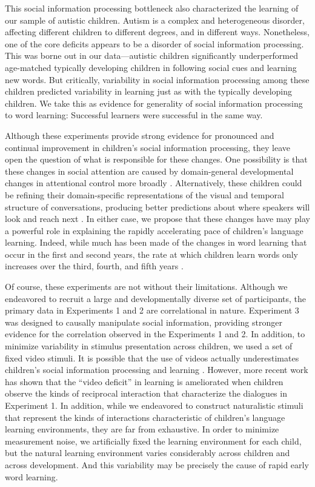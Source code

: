 \documentclass{pnastwo}
\begin{document}
\begin{article}
This social information processing bottleneck also characterized the learning of our sample of autistic children. Autism is a complex and heterogeneous disorder, affecting different children to different degrees, and in different ways. Nonetheless, one of the core deficits appears to be a disorder of social information processing. This was borne out in our data---autistic children significantly underperformed age-matched typically developing children in following social cues and learning new words. But critically, variability in social information processing among these children predicted variability in learning just as with the typically developing children.  We take this as evidence for generality of social information processing to word learning: Successful learners were successful in the same way.

Although these experiments provide strong evidence for pronounced and continual improvement in children's social information processing, they leave open the question of what is responsible for these changes. One possibility is that these changes in social attention are caused by domain-general developmental changes in attentional control more broadly \cite{rueda2005,smith2013}. Alternatively, these children could be refining their domain-specific representations of the visual and temporal structure of conversations, producing better predictions about where speakers will look and reach next \cite{acheson2009,krogh-jespersen2015}. In either case, we propose that these changes have may play a powerful role in explaining the rapidly accelerating pace of children's language learning. Indeed, while much has been made of the changes in word learning that occur in the first and second years, the rate at which children learn words only increases over the third, fourth, and fifth years \cite{bloom2000}. 

Of course, these experiments are not without their limitations. Although we endeavored to recruit a large and developmentally diverse set of participants, the primary data in Experiments 1 and 2 are correlational in nature. Experiment 3 was designed to causally manipulate social information, providing stronger evidence for the correlation observed in the Experiments 1 and 2. In addition, to minimize variability in stimulus presentation across children, we used a set of fixed video stimuli. It is possible that the use of videos actually underestimates children's social information processing and learning \cite{anderson2005}. However, more recent work has shown that the ``video deficit'' in learning is ameliorated when children observe the kinds of reciprocal interaction that characterize the dialogues in Experiment 1. In addition, while we endeavored to construct naturalistic stimuli that represent the kinds of interactions characteristic of children's language learning environments, they are far from exhaustive. In order to minimize measurement noise, we artificially fixed the learning environment for each child, but the natural learning environment varies considerably across children and across development. And this variability may be precisely the cause of rapid early word learning.


\end{article}
\end{document}
